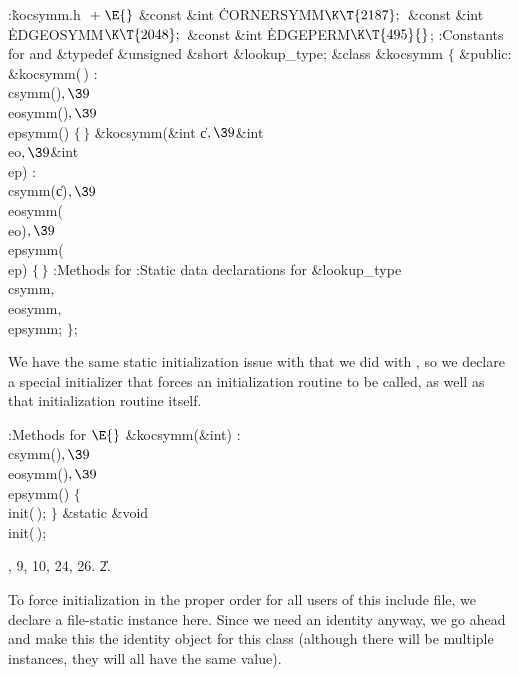 \Y\B\4:\.{kocsymm.h }\X${}\mathrel+\E{}$\6
\&{const} \&{int} \.{CORNERSYMM}${}\K\T{2187};{}$\6
\&{const} \&{int} \.{EDGEOSYMM}${}\K\T{2048};{}$\6
\&{const} \&{int} \.{EDGEPERM}${}\K\T{495}{}$;\7
:Constants for  and \X\7
\&{typedef} \&{unsigned} \&{short} \&{lookup\_type};\6
\&{class} \&{kocsymm} ${}\{{}$\1\6
\4\&{public}:\6
\&{kocsymm}(\,)\1\1\2\2\6
: \\{csymm}()${},\39{}$ \\{eosymm}()${},\39{}$ \\{epsymm}() ${}%
\{\,\}{}$\7
\&{kocsymm}(\&{int} \|c${},\39{}$\&{int} \\{eo}${},\39{}$\&{int} \\{ep})\1\1\2%
\2\6
: \\{csymm}(\|c)${},\39{}$ \\{eosymm}(\\{eo})${},\39{}$ \\{epsymm}(\\{ep}) ${}%
\{\,\}{}$\7
:Methods for \X\6
:Static data declarations for \X\7
\&{lookup\_type} \\{csymm}${},{}$ \\{eosymm}${},{}$ \\{epsymm};\2\7
${}\}{}$;\par
\fi

We have the same static initialization issue with  that we
did with , so we declare a special initializer that forces
an initialization routine to be called, as well as that initialization
routine itself.

\Y\B\4:Methods for \X${}\E{}$\6
\&{kocsymm}(\&{int})\1\1\2\2\6
: \\{csymm}()${},\39{}$ \\{eosymm}()${},\39{}$ \\{epsymm}() ${}%
\{{}$\1\6
\\{init}(\,);\6
\4${}\}{}$\2\7
\&{static} \&{void} \\{init}(\,);\par
{}, 9, 10, 24, 26.
\U2.\fi

To force initialization in the proper order for all users of this
include file, we declare a file-static instance here.  Since we
need an identity anyway, we go ahead and make this the identity
object for this class (although there will be multiple instances,
they will all have the same value).

